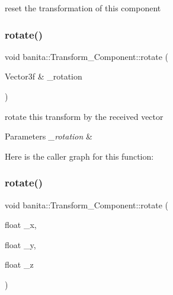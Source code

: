 reset the transformation of this component 

\mbox{\label{classbanita_1_1_transform___component_abbcce56f6a091161a8ab5e83499282f0}} 
\subsubsection{\texorpdfstring{rotate()}{rotate()}\hspace{0.1cm}{\footnotesize\ttfamily [1/2]}}
{\footnotesize\ttfamily void banita\+::\+Transform\+\_\+\+Component\+::rotate (\begin{DoxyParamCaption}\item[{Vector3f \&}]{\+\_\+rotation }\end{DoxyParamCaption})\hspace{0.3cm}{\ttfamily [inline]}}



rotate this transform by the received vector 


\begin{DoxyParams}{Parameters}
{\em \+\_\+rotation} & \\
\hline
\end{DoxyParams}
Here is the caller graph for this function\+:
\mbox{\label{classbanita_1_1_transform___component_a4def5a4bcc460815fbfede39643bd08e}} 
\subsubsection{\texorpdfstring{rotate()}{rotate()}\hspace{0.1cm}{\footnotesize\ttfamily [2/2]}}
{\footnotesize\ttfamily void banita\+::\+Transform\+\_\+\+Component\+::rotate (\begin{DoxyParamCaption}\item[{float}]{\+\_\+x,  }\item[{float}]{\+\_\+y,  }\item[{float}]{\+\_\+z }\end{DoxyParamCaption})\hspace{0.3cm}{\ttfamily [inline]}}



